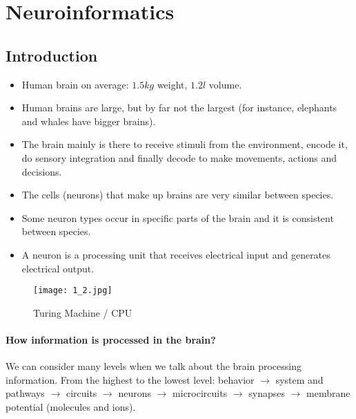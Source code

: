 \documentclass[main]{subfiles}
\begin{document}

\section{Neuroinformatics}

\subsection{Introduction}
\begin{itemize}[noitemsep,nolistsep]
	\item Human brain on average: $1.5 kg$ weight, $1.2 l$ volume.
	\item Human brains are large, but by far not the largest (for instance, elephants and whales have bigger brains).
	\item The brain mainly is there to receive stimuli from the environment, encode it, do sensory integration and finally decode to make movements, actions and decisions.
	\item The cells (neurons) that make up brains are very similar between species.
	\item Some neuron types occur in specific parts of the brain and it is consistent between species.
	\item A neuron is a processing unit that receives electrical input and generates electrical output.

\end{itemize}
\begin{figure}[htbp]
	\centering
	\texttt{[image: 1\_2.jpg]}
 	\caption{Turing Machine / CPU}
\end{figure} 

\paragraph{How information is processed in the brain?}
We can consider many levels when we talk about the brain processing information. From the highest to the lowest level: behavior $\rightarrow$ system and pathways $\rightarrow$ circuits $\rightarrow$ neurons $\rightarrow$ microcircuits $\rightarrow$ synapses $\rightarrow$ membrane potential (molecules and ions). \\
\end{document}
